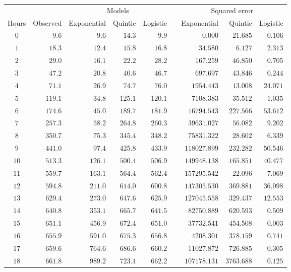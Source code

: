 \begin{tabular}{crrrrcrrr} \toprule
      &          & \multicolumn{3}{c}{Models} && \multicolumn{3}{c}{Squared error} \\
  \cmidrule{3-5} \cmidrule{7-9}
Hours & Observed & Exponential & Quintic & Logistic && Exponential  & Quintic    & Logistic \\\midrule
$0$   & $9.6$    & $9.6$       & $14.3$  & $9.9$    && $0.000$      & $21.685$   & $0.106$  \\[4pt]
$1$   & $18.3$   & $12.4$      & $15.8$  & $16.8$   && $34.580$     & $6.127$    & $2.313$  \\[4pt]
$2$   & $29.0$   & $16.1$      & $22.2$  & $28.2$   && $167.259$    & $46.850$   & $0.705$  \\[4pt]
$3$   & $47.2$   & $20.8$      & $40.6$  & $46.7$   && $697.697$    & $43.846$   & $0.244$  \\[4pt]
$4$   & $71.1$   & $26.9$      & $74.7$  & $76.0$   && $1954.443$   & $13.008$   & $24.071$ \\[4pt]
$5$   & $119.1$  & $34.8$      & $125.1$ & $120.1$  && $7108.383$   & $35.512$   & $1.035$  \\[4pt]
$6$   & $174.6$  & $45.0$      & $189.7$ & $181.9$  && $16794.543$  & $227.566$  & $53.612$ \\[4pt]
$7$   & $257.3$  & $58.2$      & $264.8$ & $260.3$  && $39631.027$  & $56.082$   & $9.202$  \\[4pt]
$8$   & $350.7$  & $75.3$      & $345.4$ & $348.2$  && $75831.322$  & $28.602$   & $6.339$  \\[4pt]
$9$   & $441.0$  & $97.4$      & $425.8$ & $433.9$  && $118027.899$ & $232.282$  & $50.546$ \\[4pt]
$10$  & $513.3$  & $126.1$     & $500.4$ & $506.9$  && $149948.138$ & $165.851$  & $40.477$ \\[4pt]
$11$  & $559.7$  & $163.1$     & $564.4$ & $562.4$  && $157295.542$ & $22.096$   & $7.069$  \\[4pt]
$12$  & $594.8$  & $211.0$     & $614.0$ & $600.8$  && $147305.530$ & $369.881$  & $36.098$ \\[4pt]
$13$  & $629.4$  & $273.0$     & $647.6$ & $625.9$  && $127045.558$ & $329.437$  & $12.553$ \\[4pt]
$14$  & $640.8$  & $353.1$     & $665.7$ & $641.5$  && $82750.889$  & $620.593$  & $0.509$  \\[4pt]
$15$  & $651.1$  & $456.9$     & $672.4$ & $651.0$  && $37732.541$  & $454.508$  & $0.003$  \\[4pt]
$16$  & $655.9$  & $591.0$     & $675.3$ & $656.8$  && $4208.301$   & $378.159$  & $0.741$  \\[4pt]
$17$  & $659.6$  & $764.6$     & $686.6$ & $660.2$  && $11027.872$  & $726.885$  & $0.305$  \\[4pt]
$18$  & $661.8$  & $989.2$     & $723.1$ & $662.2$  && $107178.131$ & $3763.688$ & $0.125$  \\\bottomrule
\end{tabular}

